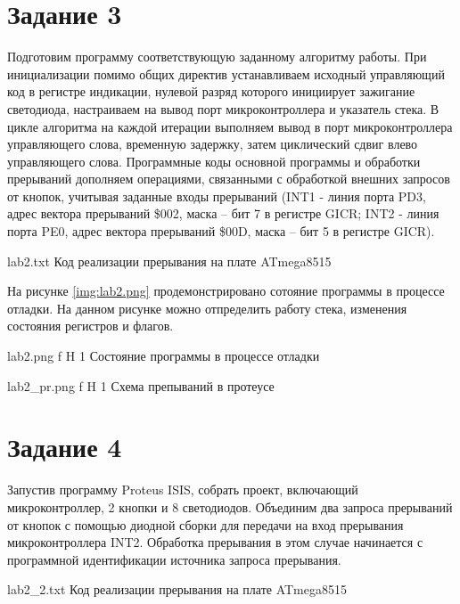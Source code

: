 \documentclass{bmstu}
\begin{document}
\section{Задание 3}
Подготовим  программу соответствующую заданному алгоритму работы. При инициализации помимо общих директив устанавливаем исходный управляющий код в регистре индикации,  нулевой разряд которого инициирует зажигание светодиода, настраиваем  на вывод порт  микроконтроллера и указатель стека.
В цикле алгоритма на каждой итерации выполняем вывод в порт микроконтроллера управляющего слова, временную задержку, затем циклический сдвиг влево управляющего слова. 
Программные коды основной программы и обработки прерываний дополняем операциями, связанными с обработкой внешних запросов от кнопок, учитывая заданные входы прерываний (INT1 - линия порта PD3, адрес вектора прерываний \$002, маска – бит 7 в регистре GICR; INT2 - линия порта PE0, адрес вектора прерываний \$00D, маска – бит 5 в регистре GICR). 

	{lab2.txt}
	{Код реализации прерывания на плате ATmega8515}

На рисунке \ref{img:lab2.png} продемонстрировано сотояние программы в процессе отладки. На данном рисунке можно отпределить работу стека, изменения состояния регистров и флагов.

    {lab2.png} %
    {f} %
    {H} %
    {1\textwidth} %
    {Состояние программы в процессе отладки} 
    

    {lab2_pr.png} %
    {f} %
    {H} %
    {1\textwidth} %
    {Схема препываний в протеусе} %

\newpage
\section{Задание 4}
Запустив программу Proteus ISIS, собрать проект, включающий микроконтроллер, 2 кнопки и 8 светодиодов.
Объединим два запроса прерываний от кнопок с помощью диодной сборки для передачи на вход прерывания микроконтроллера INT2. Обработка прерывания в этом случае начинается с программной идентификации источника запроса прерывания.

	{lab2_2.txt}
	{Код реализации прерывания на плате ATmega8515}
\end{document}
